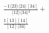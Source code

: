 \documentclass[varwidth, border=5pt]{standalone}
\begin{document}
\begin{my}
$\begin{gathered}
\scriptscriptstyle\frac{-1⟨23⟩⟨24⟩[34]}{⟨12⟩⟨34⟩²} +\\
\scriptscriptstyle\frac{1[13][14]}{[12]⟨34⟩} \phantom{+}
\end{gathered}$
\end{my}
\end{document}
